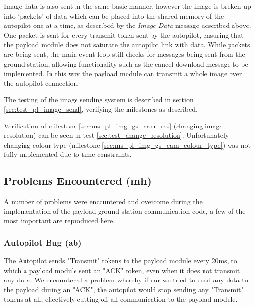 Image data is also sent in the same basic manner, however the image is broken up into `packets' of data
which can be placed into the shared memory of the autopilot one at a time, as described by the \emph{Image Data}
message described above. One packet is sent for every transmit token sent by the autopilot, ensuring that the
payload module does not saturate the autopilot link with data. While packets are being sent, the main event loop
still checks for messages being sent from the ground station, allowing functionality such as the cancel download message 
to be implemented. In this way the payload module can transmit a whole image over the autopilot connection.

The testing of the image sending system is described in section \ref{sec:test_pl_image_send}, verifying the milestones 
as described.

Verification of milestone \ref{sec:ms_pl_img_gs_cam_res} (changing image resolution) can be seen in test \ref{sec:test_change_resolution}. Unfortunately changing colour type (milestone \ref{sec:ms_pl_img_gs_cam_colour_type})  was not fully implemented due to time constraints.

\subsection{Problems Encountered (mh)}
\label{sec:probls_pl}
A number of problems were encountered and overcome during the implementation of the payload-ground station
communication code, a few of the most important are reproduced here.

\subsubsection*{Autopilot Bug (ab)}

The Autopilot sends "Transmit" tokens to the payload module every 20ms, 
to which a payload module sent an "ACK" token, even when it does not 
transmit any data. We encountered a problem whereby if our we tried to 
send any data to the payload during an "ACK", the autopilot would stop 
sending any "Transmit" tokens at all, effectively cutting off all 
communication to the payload module.


